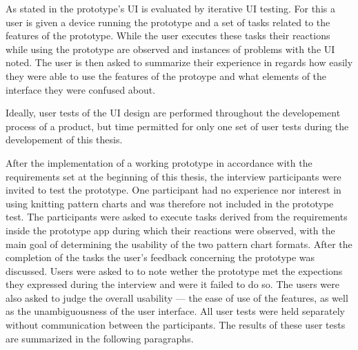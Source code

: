 As stated in  the prototype's \gls{UI} is evaluated by iterative \gls{UI} testing. For this a user is given a device running the prototype and a set of tasks related to the features of the prototype. While the user executes these tasks their reactions while using the prototype are observed and instances of problems with the \gls{UI} noted. The user is then asked to summarize their experience in regards how easily they were able to use the features of the protoype and what elements of the interface they were confused about.

Ideally, user tests of the \gls{UI} design are performed throughout the developement process of a product, but time permitted for only one set of user tests during the developement of this thesis.

After the implementation of a working prototype in accordance with the requirements set at the beginning of this thesis, the interview participants were invited to test the prototype. One participant had no experience nor interest in using knitting pattern charts and was therefore not included in the prototype test.
The participants were asked to execute tasks derived from the requirements inside the prototype app during which their reactions were observed, with the main goal of determining the usability of the two pattern chart formats. After the completion of the tasks the user's feedback concerning the prototype was discussed. Users were asked to to note wether the prototype met the expections they expressed during the interview and were it failed to do so. The users were also asked to judge the overall usability --- the ease of use of the features, as well as the unambiguousness of the user interface. All user tests were held separately without communication between the participants. The results of these user tests are summarized in the following paragraphs.

